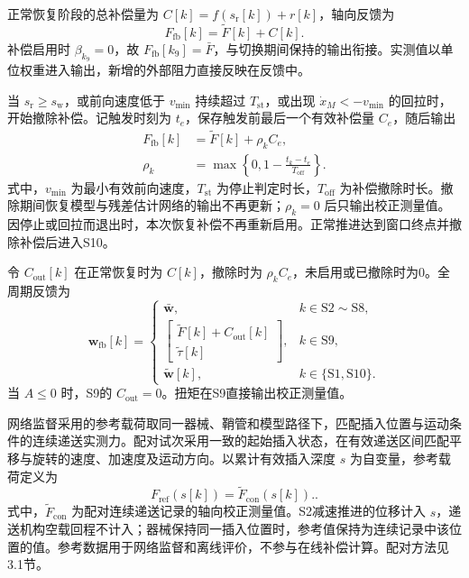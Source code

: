 \documentclass{JQR_LaTeX_Template-0507/JQRnew}
\begin{document}
正常恢复阶段的总补偿量为 $C[k]=f(s_{\mathrm r}[k])+r[k]$，轴向反馈为
\begin{equation}
\label{eq:active-output}
F_{\mathrm{fb}}[k]=\tilde F[k]+C[k].
\end{equation}
补偿启用时 $\beta_{k_9}=0$，故 $F_{\mathrm{fb}}[k_9]=\bar F$，与切换期间保持的输出衔接。实测值以单位权重进入输出，新增的外部阻力直接反映在反馈中。

当 $s_{\mathrm r}\ge s_{\mathrm w}$，或前向速度低于 $v_{\min}$ 持续超过 $T_{\mathrm{st}}$，或出现 $\dot x_M<-v_{\min}$ 的回拉时，开始撤除补偿。记触发时刻为 $t_e$，保存触发前最后一个有效补偿量 $C_e$，随后输出
\begin{equation}
\label{eq:withdrawal}
\begin{aligned}
F_{\mathrm{fb}}[k]&=\tilde F[k]+\rho_kC_e,\\
\rho_k&=\max\!\left\{0,1-\frac{t_k-t_e}{T_{\mathrm{off}}}\right\}.
\end{aligned}
\end{equation}
式中，$v_{\min}$ 为最小有效前向速度，$T_{\mathrm{st}}$ 为停止判定时长，$T_{\mathrm{off}}$ 为补偿撤除时长。撤除期间恢复模型与残差估计网络的输出不再更新；$\rho_k=0$ 后只输出校正测量值。因停止或回拉而退出时，本次恢复补偿不再重新启用。正常推进达到窗口终点并撤除补偿后进入S10。

令 $C_{\mathrm{out}}[k]$ 在正常恢复时为 $C[k]$，撤除时为 $\rho_kC_e$，未启用或已撤除时为0。全周期反馈为
\begin{equation}
\label{eq:phase-output}
\bm w_{\mathrm{fb}}[k]=
\begin{cases}
\bar{\bm w},&k\in\mathrm{S2}\sim\mathrm{S8},\\
\begin{bmatrix}\tilde F[k]+C_{\mathrm{out}}[k]\\
\tilde\tau[k]\end{bmatrix},&k\in\mathrm{S9},\\
\tilde{\bm w}[k],&k\in\{\mathrm{S1},\mathrm{S10}\}.
\end{cases}
\end{equation}
当 $A\le0$ 时，S9的 $C_{\mathrm{out}}=0$。扭矩在S9直接输出校正测量值。

网络监督采用的参考载荷取同一器械、鞘管和模型路径下，匹配插入位置与运动条件的连续递送实测力。配对试次采用一致的起始插入状态，在有效递送区间匹配平移与旋转的速度、加速度及运动方向。以累计有效插入深度 $s$ 为自变量，参考载荷定义为
\begin{equation}
	\label{eq:reference}
	F_{\mathrm{ref}}(s[k])=\tilde F_{\mathrm{con}}(s[k])..
\end{equation}
式中，$\tilde F_{\mathrm{con}}$ 为配对连续递送记录的轴向校正测量值。S2减速推进的位移计入 $s$，递送机构空载回程不计入；器械保持同一插入位置时，参考值保持为连续记录中该位置的值。参考数据用于网络监督和离线评价，不参与在线补偿计算。配对方法见3.1节。
\end{document}
